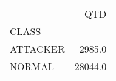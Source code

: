 \begin{tabular}{lr}
\toprule
{} &      QTD \\
CLASS    &          \\
\midrule
ATTACKER &   2985.0 \\
NORMAL   &  28044.0 \\
\bottomrule
\end{tabular}

